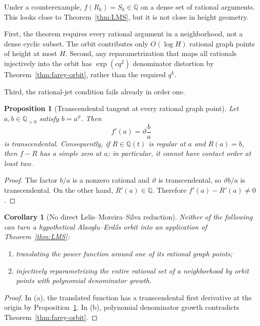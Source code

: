 \documentclass[11pt]{article}
\newtheorem{proposition}[theorem]{Proposition}
\newtheorem{corollary}[theorem]{Corollary}
\theoremstyle{definition}
\theoremstyle{remark}
\newcommand{\Q}{\mathbb Q}
\begin{document}
Under a counterexample, $f(R_k)=S_k\in\Q$ on a dense set of rational arguments.  This looks
close to Theorem~\ref{thm:LMS}, but it is not close in height geometry.

First, the theorem requires every rational argument in a neighborhood, not a dense cyclic
subset.  The orbit contributes only $O(\log H)$ rational graph points of height at most $H$.
Second, any reparametrization that maps all rationals injectively into the orbit has
$\exp(cq^2)$ denominator distortion by Theorem~\ref{thm:farey-orbit}, rather than the required
$q^k$.

Third, the rational-jet condition fails already in order one.

\begin{proposition}[Transcendental tangent at every rational graph point]
\label{prop:transverse}
Let $a,b\in\Q_{>0}$ satisfy $b=a^\vartheta$.  Then
\[
 f'(a)=\vartheta\frac ba
\]
is transcendental.  Consequently, if $R\in\Q(t)$ is regular at $a$ and $R(a)=b$, then
$f-R$ has a simple zero at $a$; in particular, it cannot have contact order at least two.
\end{proposition}

\begin{proof}
The factor $b/a$ is a nonzero rational and $\vartheta$ is transcendental, so
$\vartheta b/a$ is transcendental.  On the other hand, $R'(a)\in\Q$.  Therefore
$f'(a)-R'(a)\ne0$.
\end{proof}

\begin{corollary}[No direct Lelis--Moreira--Silva reduction]
\label{cor:no-LMS}
Neither of the following can turn a hypothetical Alaoglu--Erd\H{o}s orbit into an
application of Theorem~\ref{thm:LMS}:
\begin{enumerate}[label=(\alph*),leftmargin=2.2em]
\item translating the power function around one of its rational graph points;
\item injectively reparametrizing the entire rational set of a neighborhood by orbit points
      with polynomial denominator growth.
\end{enumerate}
\end{corollary}

\begin{proof}
In (a), the translated function has a transcendental first derivative at the origin by
Proposition~\ref{prop:transverse}.  In (b), polynomial denominator growth contradicts
Theorem~\ref{thm:farey-orbit}.
\end{proof}
\end{document}
